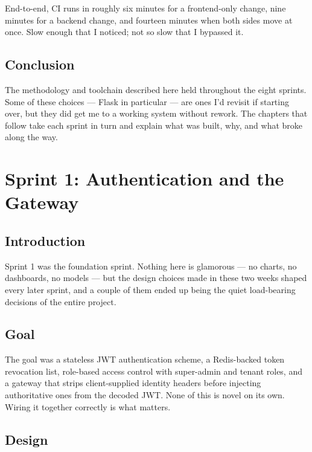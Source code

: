 \documentclass[12pt, a4paper]{report}
\begin{document}
End-to-end, CI runs in roughly six minutes for a frontend-only change,
nine minutes for a backend change, and fourteen minutes when both sides
move at once. Slow enough that I noticed; not so slow that I bypassed
it.

\section*{Conclusion}

The methodology and toolchain described here held throughout the eight
sprints. Some of these choices --- Flask in particular --- are ones I'd
revisit if starting over, but they did get me to a working system
without rework. The chapters that follow take each sprint in turn and
explain what was built, why, and what broke along the way.

\chapter{Sprint 1: Authentication and the Gateway}

\section*{Introduction}

Sprint 1 was the foundation sprint. Nothing here is glamorous --- no
charts, no dashboards, no models --- but the design choices made in
these two weeks shaped every later sprint, and a couple of them ended
up being the quiet load-bearing decisions of the entire project.

\section{Goal}

The goal was a stateless JWT authentication scheme, a Redis-backed
token revocation list, role-based access control with super-admin and
tenant roles, and a gateway that strips client-supplied identity
headers before injecting authoritative ones from the decoded JWT. None
of this is novel on its own. Wiring it together correctly is what
matters.

\section{Design}
\end{document}
